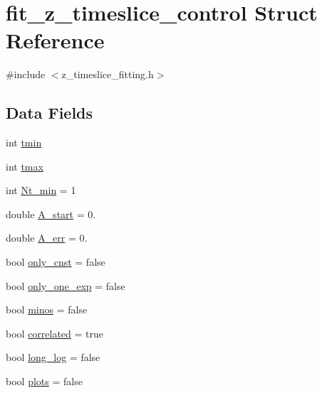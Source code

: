 \hypertarget{structfit__z__timeslice__control}{}\section{fit\+\_\+z\+\_\+timeslice\+\_\+control Struct Reference}
\label{structfit__z__timeslice__control}


{\ttfamily \#include $<$z\+\_\+timeslice\+\_\+fitting.\+h$>$}

\subsection*{Data Fields}
\begin{DoxyCompactItemize}
\item 
int \mbox{\hyperlink{structfit__z__timeslice__control_af280756dc4272664033003b4eb1e2d8e}{tmin}}
\item 
int \mbox{\hyperlink{structfit__z__timeslice__control_aadf740b8dfbe28be6c86f6e129dc5153}{tmax}}
\item 
int \mbox{\hyperlink{structfit__z__timeslice__control_a1cec3e6bb611457466c36ec5c5541fa7}{Nt\+\_\+min}} = 1
\item 
double \mbox{\hyperlink{structfit__z__timeslice__control_ac6545863601f180297b382237a9363ea}{A\+\_\+start}} = 0.
\item 
double \mbox{\hyperlink{structfit__z__timeslice__control_a823706e31d9be6ff58d4088e9af22e3c}{A\+\_\+err}} = 0.
\item 
bool \mbox{\hyperlink{structfit__z__timeslice__control_af924289ee1b3c0b9094a0e55a0784075}{only\+\_\+cnst}} = false
\item 
bool \mbox{\hyperlink{structfit__z__timeslice__control_a4ba8d55b8b78c1b5b5e528594f8b0c79}{only\+\_\+one\+\_\+exp}} = false
\item 
bool \mbox{\hyperlink{structfit__z__timeslice__control_a37f2f75026ac17c1fe05098fee5f84c4}{minos}} = false
\item 
bool \mbox{\hyperlink{structfit__z__timeslice__control_a1f81454753238e8740664f3e295113d4}{correlated}} = true
\item 
bool \mbox{\hyperlink{structfit__z__timeslice__control_ab40b754caf22f30c13d401ebdd017363}{long\+\_\+log}} = false
\item 
bool \mbox{\hyperlink{structfit__z__timeslice__control_a2179cb43f27d92144755e397003ec28d}{plots}} = false
\end{DoxyCompactItemize}


